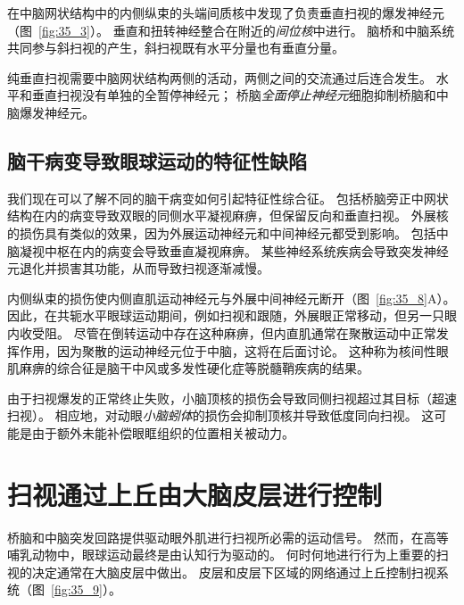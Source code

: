 在中脑网状结构中的内侧纵束的头端间质核中发现了负责垂直扫视的爆发神经元（图~\ref{fig:35_3}）。
垂直和扭转神经整合在附近的\textit{间位核}中进行。
脑桥和中脑系统共同参与斜扫视的产生，斜扫视既有水平分量也有垂直分量。


纯垂直扫视需要中脑网状结构两侧的活动，两侧之间的交流通过后连合发生。
水平和垂直扫视没有单独的全暂停神经元；
桥脑\textit{全面停止神经元}细胞抑制桥脑和中脑爆发神经元。



\subsection{脑干病变导致眼球运动的特征性缺陷}

我们现在可以了解不同的脑干病变如何引起特征性综合征。
包括桥脑旁正中网状结构在内的病变导致双眼的同侧水平凝视麻痹，但保留反向和垂直扫视。
外展核的损伤具有类似的效果，因为外展运动神经元和中间神经元都受到影响。
包括中脑凝视中枢在内的病变会导致垂直凝视麻痹。
某些神经系统疾病会导致突发神经元退化并损害其功能，从而导致扫视逐渐减慢。


内侧纵束的损伤使内侧直肌运动神经元与外展中间神经元断开（图~\ref{fig:35_8}A）。
因此，在共轭水平眼球运动期间，例如扫视和跟随，外展眼正常移动，但另一只眼内收受阻。
尽管在倒转运动中存在这种麻痹，但内直肌通常在聚散运动中正常发挥作用，因为聚散的运动神经元位于中脑，这将在后面讨论。
这种称为核间性眼肌麻痹的综合征是脑干中风或多发性硬化症等脱髓鞘疾病的结果。


由于扫视爆发的正常终止失败，小脑顶核的损伤会导致同侧扫视超过其目标（超速扫视）。
相应地，对动眼\textit{小脑蚓体}的损伤会抑制顶核并导致低度同向扫视。
这可能是由于额外未能补偿眼眶组织的位置相关被动力。



\section{扫视通过上丘由大脑皮层进行控制}

桥脑和中脑突发回路提供驱动眼外肌进行扫视所必需的运动信号。
然而，在高等哺乳动物中，眼球运动最终是由认知行为驱动的。
何时何地进行行为上重要的扫视的决定通常在大脑皮层中做出。
皮层和皮层下区域的网络通过上丘控制扫视系统（图~\ref{fig:35_9}）。


